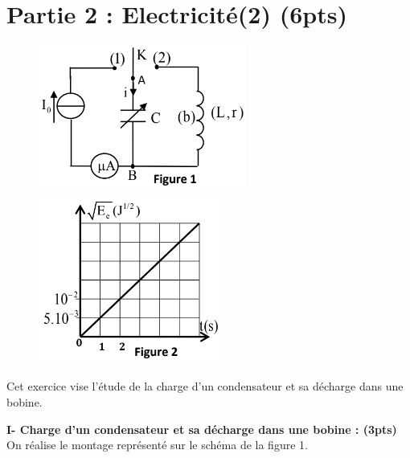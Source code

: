 \documentclass[12pt]{article}
\begin{document}
\section*{Partie 2 : Electricité(2) \dotfill(6pts) }

\begin{figure}
\includegraphics[width=0.9\linewidth]{./img/phys02.png} 
\includegraphics[width=0.9\linewidth]{./img/phys03.png} 
\end{figure}


Cet exercice vise l’étude de la charge d’un condensateur et sa décharge dans une bobine.

\textbf{I- Charge d’un condensateur et sa décharge dans une bobine : (3pts)}
On réalise le montage représenté sur le schéma de la figure 1. 
\end{document}
